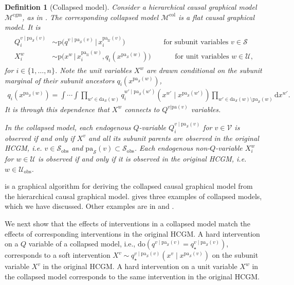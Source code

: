 \documentclass[12pt]{article}
\newtheorem{definition}{Definition}
\newcommand{\Sc}{\mathcal{S}}
\newcommand{\rmdo}{\mathrm{do}}
\newcommand{\di}{\mathrm{d}}
\newcommand{\pa}{\mathrm{pa}}
\newcommand{\da}{\mathrm{da}}
\newcommand{\pr}{\mathrm{p}}
\newcommand{\obs}{\mathrm{obs}}
\newcommand{\col}{\mathrm{col}}
\newcommand{\Mc}{\mathcal{M}}
\newcommand{\cgm}{\mathrm{cgm}}
\begin{document}
\begin{definition}[Collapsed model] \label{def:um} Consider a
  hierarchical causal graphical model $\Mc^\cgm$, as in
  .  The corresponding collapsed model $\Mc^\col$ is a
  flat causal graphical model. It is
\begin{align}
  \begin{split}
    Q^{v\mid \pa_\mathcal{S}(v)}_i
    &\sim
      \pr\big(q^{v\mid
      \pa_\mathcal{S}(v)} \, \big| \, x^{\pa_\mathcal{U}(v)}_{i}\big)
      \quad \quad \quad \quad \quad
      \text{ for subunit variables } v \in \mathcal{S} \\
    X^{w}_i
    &\sim
      \pr\big(x^{w} \, \big| \, x^{\pa_\mathcal{U}(w)}_{i},
      q_i(x^{\pa_\mathcal{S}(w)})\big)
      \quad \quad \quad
      \text{ for unit variables } w \in \mathcal{U},
\end{split}
\end{align}
for $i \in \{1, \ldots, n\}$. Note the unit variables $X^w$ are drawn
conditional on the subunit marginal of their subunit ancestors
$q_i(x^{\pa_\mathcal{S}(w)})$,
\begin{align}
  \label{eqn:parent_marginal}
  q_i(x^{\pa_\mathcal{S}(w)}) =
  \int \cdots \int
  \prod_{w' \in \da_\mathcal{S}(w)} q_i^{w' \mid
  \pa_\mathcal{S}(w')}(x^{w'} \mid x^{\pa_\mathcal{S}(w')})
  \prod_{w' \in \da_{\mathcal{S}}(w) \setminus \pa_\mathcal{S}(w)}
  \di x^{w'}.
\end{align}
It is through this dependence that $X^w$ connects to
$Q^{v|\pa(v)}$ variables.

In the collapsed model, each endogenous $Q$-variable
$Q_i^{v \mid \pa_\mathcal{S}(v)}$ for $v \in \mathcal{V}$ is observed
if and only if $X^v$ and all its subunit parents are observed in the
original HCGM, i.e. $v \in \Sc_{\obs}$ and
$\pa_\mathcal{S}(v) \subset \mathcal{S}_{\obs}$.  Each endogenous
non-$Q$-variable $X^w_i$ for $w \in \mathcal{U}$ is observed if and
only if it is observed in the original HCGM, i.e.
$w \in \mathcal{U}_{\obs}$.
\end{definition}





 is a graphical algorithm for deriving the
collapsed causal graphical model from the hierarchical causal
graphical model.  gives three examples of
collapsed models, which we have discussed. Other examples are in
 and .

We next show that the effects of interventions in a collapsed model
match the effects of corresponding interventions in the original HCGM.
A hard intervention on a $Q$ variable of a collapsed model, i.e.,
$\rmdo(q^{v\mid \pa_\mathcal{S}(v)} = q_\star^{v\mid
  \pa_\mathcal{S}(v)})$, corresponds to a soft intervention
$X^v \sim q_\star^{v\mid \pa_\mathcal{S}(v)}(x^v \mid
x^{\pa_\mathcal{S}(v)})$ on the subunit variable $X^v$ in the original HCGM.
A hard intervention on a unit variable $X^w$  in the collapsed model
corresponds to the same intervention in the original HCGM.
\end{document}
